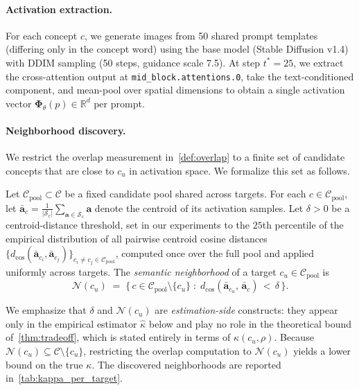 \paragraph{Activation extraction.}
For each concept $c$, we generate images from 50 shared prompt templates (differing only in the concept word) using the base model (Stable Diffusion v1.4) with DDIM sampling (50 steps, guidance scale 7.5). At step $t^*{=}25$, we extract the cross-attention output at \texttt{mid\_block.attentions.0}, take the text-conditioned component, and mean-pool over spatial dimensions to obtain a single activation vector $\boldsymbol{\Phi}_\theta(p) \in \mathbb{R}^d$ per prompt. 


\paragraph{Neighborhood discovery.}
We restrict the overlap measurement in~\cref{def:overlap} to a finite set of candidate concepts that are close to $c_u$ in activation space. We formalize this set as follows.

\begin{definition}
\label{def:semantic_neighborhood}
Let $\mathcal{C}_{\mathrm{pool}} \subset \mathcal{C}$ be a fixed candidate pool shared across targets. For each $c \in \mathcal{C}_{\mathrm{pool}}$, let $\bar{\mathbf{a}}_c = \tfrac{1}{|\mathcal{S}_c|}\sum_{\mathbf{a}\in\mathcal{S}_c}\mathbf{a}$ denote the centroid of its activation samples. Let $\delta > 0$ be a centroid-distance threshold, set in our experiments to the $25$th percentile of the empirical distribution of all pairwise centroid cosine distances $\{d_{\cos}(\bar{\mathbf{a}}_{c_i}, \bar{\mathbf{a}}_{c_j})\}_{c_i \neq c_j \in \mathcal{C}_{\mathrm{pool}}}$, computed once over the full pool and applied uniformly across targets. The \emph{semantic neighborhood} of a target $c_u \in \mathcal{C}_{\mathrm{pool}}$ is
\begin{equation}
    \mathcal{N}(c_u) \;=\; \bigl\{\, c \in \mathcal{C}_{\mathrm{pool}} \setminus \{c_u\} \;:\; d_{\cos}(\bar{\mathbf{a}}_{c_u},\,\bar{\mathbf{a}}_c) \,<\, \delta \,\bigr\}.
\end{equation}
\end{definition}
We emphasize that $\delta$ and $\mathcal{N}(c_u)$ are \emph{estimation-side} constructs: they appear only in the empirical estimator $\hat\kappa$ below and play no role in the theoretical bound of~\cref{thm:tradeoff}, which is stated entirely in terms of $\kappa(c_u, \rho)$. Because $\mathcal{N}(c_u) \subseteq \mathcal{C} \setminus \{c_u\}$, restricting the overlap computation to $\mathcal{N}(c_u)$ yields a lower bound on the true $\kappa$. The discovered neighborhoods are reported in~\cref{tab:kappa_per_target}.


